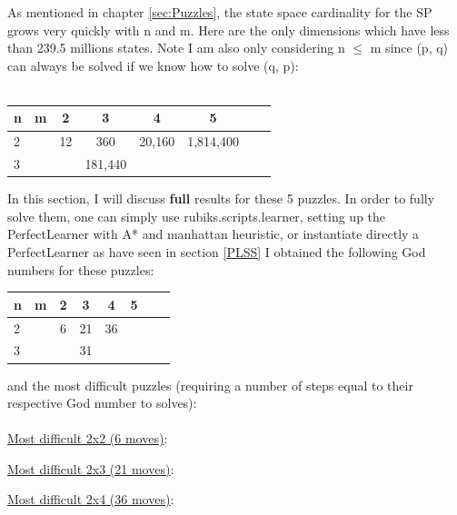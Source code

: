 As mentioned in chapter \ref{sec:Puzzles}, the state space cardinality for the SP grows very quickly with n and m. Here are the only dimensions which have less than 239.5 millions states. Note I am also only considering n $\leq$ m since (p, q) can always be solved if we know how to solve (q, p):
\\
\\
\begin{center}
\begin{tabular}{l*{6}{c}r}
n              & m & 2 & 3 & 4 & 5\\
\hline
2              &   & 12 & 360 & 20,160 & 1,814,400 \\
3              &   &   & 181,440 &  &    \\
\end{tabular}
\end{center}
In this section, I will discuss \textbf{full} results for these 5 puzzles. In order to fully solve them, one can simply use rubiks.scripts.learner, setting up the PerfectLearner with A* and manhattan heuristic, or instantiate directly a PerfectLearner as have seen in section \ref{PLSS}
I obtained the following God numbers for these puzzles:
\begin{center}
\begin{tabular}{l*{6}{c}r}
n              & m & 2 & 3 & 4 & 5\\
\hline
2              &   & 6 & 21 & 36 &  \\
3              &   &   & 31 &  &    \\
\end{tabular}
\end{center}
and the most difficult puzzles (requiring a number of steps equal to their respective God number to solves):
\\
\\
\underline{Most difficult 2x2 (6 moves)}:
\begin{center}
\begin{three}
\end{three}
\end{center}
\underline{Most difficult 2x3 (21 moves)}:
\begin{center}
\begin{five}
\end{five}
\end{center}
\underline{Most difficult 2x4 (36 moves)}:
\begin{center}
\begin{seven}
\end{seven}
\end{center}
